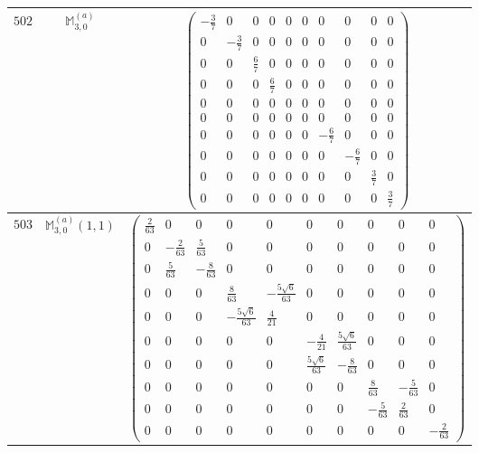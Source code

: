 \documentclass[fleqn,8pt,landscape]{jsarticle}
\begin{document}
\begin{center}
\begin{longtable}{ccc}
$ 502 $ & $ \mathbb{M}_{3,0}^{(a)} $ & $ \begin{pmatrix} - \frac{3}{7} & 0 & 0 & 0 & 0 & 0 & 0 & 0 & 0 & 0 \\ 0 & - \frac{3}{7} & 0 & 0 & 0 & 0 & 0 & 0 & 0 & 0 \\ 0 & 0 & \frac{6}{7} & 0 & 0 & 0 & 0 & 0 & 0 & 0 \\ 0 & 0 & 0 & \frac{6}{7} & 0 & 0 & 0 & 0 & 0 & 0 \\ 0 & 0 & 0 & 0 & 0 & 0 & 0 & 0 & 0 & 0 \\ 0 & 0 & 0 & 0 & 0 & 0 & 0 & 0 & 0 & 0 \\ 0 & 0 & 0 & 0 & 0 & 0 & - \frac{6}{7} & 0 & 0 & 0 \\ 0 & 0 & 0 & 0 & 0 & 0 & 0 & - \frac{6}{7} & 0 & 0 \\ 0 & 0 & 0 & 0 & 0 & 0 & 0 & 0 & \frac{3}{7} & 0 \\ 0 & 0 & 0 & 0 & 0 & 0 & 0 & 0 & 0 & \frac{3}{7} \end{pmatrix} $ \\ \hline
$ 503 $ & $ \mathbb{M}_{3,0}^{(a)}(1,1) $ & $ \begin{pmatrix} \frac{2}{63} & 0 & 0 & 0 & 0 & 0 & 0 & 0 & 0 & 0 \\ 0 & - \frac{2}{63} & \frac{5}{63} & 0 & 0 & 0 & 0 & 0 & 0 & 0 \\ 0 & \frac{5}{63} & - \frac{8}{63} & 0 & 0 & 0 & 0 & 0 & 0 & 0 \\ 0 & 0 & 0 & \frac{8}{63} & - \frac{5 \sqrt{6}}{63} & 0 & 0 & 0 & 0 & 0 \\ 0 & 0 & 0 & - \frac{5 \sqrt{6}}{63} & \frac{4}{21} & 0 & 0 & 0 & 0 & 0 \\ 0 & 0 & 0 & 0 & 0 & - \frac{4}{21} & \frac{5 \sqrt{6}}{63} & 0 & 0 & 0 \\ 0 & 0 & 0 & 0 & 0 & \frac{5 \sqrt{6}}{63} & - \frac{8}{63} & 0 & 0 & 0 \\ 0 & 0 & 0 & 0 & 0 & 0 & 0 & \frac{8}{63} & - \frac{5}{63} & 0 \\ 0 & 0 & 0 & 0 & 0 & 0 & 0 & - \frac{5}{63} & \frac{2}{63} & 0 \\ 0 & 0 & 0 & 0 & 0 & 0 & 0 & 0 & 0 & - \frac{2}{63} \end{pmatrix} $ \\ \hline

\end{longtable}
\end{center}
\end{document}
